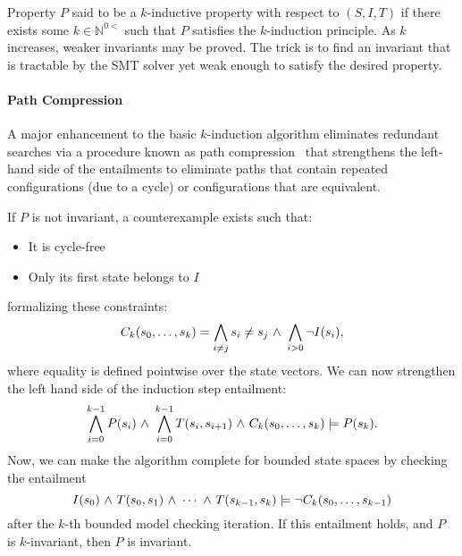 Property $P$ said to be a $k$-inductive property with respect to
$(S,I,T)$ if there exists some $k \in \mathbb{N}^{0<}$ such that $P$
satisfies the $k$-induction principle. As $k$ increases, weaker
invariants may be proved. The trick is to find an invariant that is
tractable by the SMT solver yet weak enough to satisfy the desired
property.  

\paragraph{Path Compression}  A major enhancement to the basic
$k$-induction 
algorithm eliminates redundant searches via a procedure
known as path compression~\cite{dMRS03} that strengthens the left-hand
side of the entailments to eliminate paths that contain repeated configurations  (due to
a cycle) or configurations that are equivalent.  

If $P$ is not invariant, a
counterexample exists such that:
\begin{itemize}
\item It is cycle-free
\item Only its first state belongs to $I$ 
\end{itemize}
formalizing these constraints:
$$C_k(s_0,\ldots,s_k) = \bigwedge_{i \neq j} s_i \neq s_j  {\ \wedge \ }
\bigwedge_{i > 0} {\neg} I(s_i),$$
where equality is defined  pointwise over the state vectors.
We can now strengthen the left hand side of the induction step
entailment:
$$\bigwedge^{k-1}_{i=0} P(s_i) {\ \wedge \ } \bigwedge ^{k-1}_{i=0}
T(s_i,s_{i+1}) {\ \wedge \ } C_k(s_0, \ldots, s_k) \models P(s_k). $$
Now, we can make the algorithm complete for bounded state spaces by
checking the entailment 
$$I(s_0) {\ \wedge \ } T(s_0,s_1) {\ \wedge \ } \cdots {\ \wedge \ } T(s_{k-1}, s_{k})
 \models {\neg} C_k(s_0,\ldots, s_{k-1})$$
after the $k$-th bounded model checking iteration.  If this entailment
holds, and $P$ is $k$-invariant, then $P$ is invariant. 

